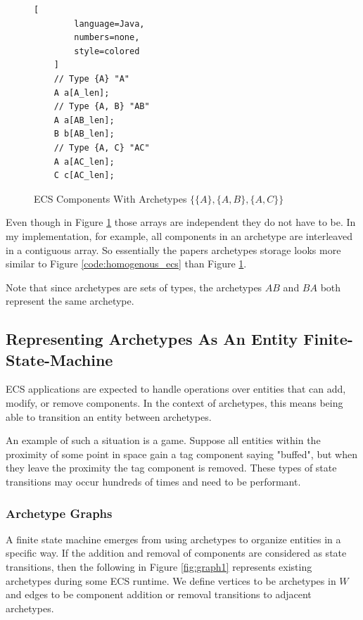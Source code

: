 \begin{figure}[H]
    \begin{lstlisting}[
        language=Java,
        numbers=none,
        style=colored
    ]
    // Type {A} "A"
    A a[A_len];
    // Type {A, B} "AB"
    A a[AB_len];
    B b[AB_len];
    // Type {A, C} "AC"
    A a[AC_len];
    C c[AC_len];
    \end{lstlisting}
    \caption{ECS Components With Archetypes $\{\{A\},\{A,B\},\{A,C\}\}$}
    \label{code:ecs_archetypes}
\end{figure}

Even though in Figure \ref{code:ecs_archetypes} those arrays are independent they do not have to be. In my implementation, for example, all components in an archetype are interleaved in a contiguous array. So essentially the papers archetypes storage looks more similar to Figure \ref{code:homogenous_ecs} than Figure \ref{code:ecs_archetypes}.

Note that since archetypes are sets of types, the archetypes $AB$ and $BA$ both represent the same archetype.

\subsection{Representing Archetypes As An Entity Finite-State-Machine}
\label{sec:fsm_arc}
ECS applications are expected to handle operations over entities that can add, modify, or remove components. In the context of archetypes, this means being able to transition an entity between archetypes. 

An example of such a situation is a game. Suppose all entities within the proximity of some point in space gain a tag component saying "buffed", but when they leave the proximity the tag component is removed. These types of state transitions may occur hundreds of times and need to be performant. 

\subsubsection{Archetype Graphs}

A finite state machine emerges from using archetypes to organize entities in a specific way. If the addition and removal of components are considered as state transitions, then the following in Figure \ref{fig:graph1} represents existing archetypes during some ECS runtime. We define vertices to be archetypes in $W$ and edges to be component addition or removal transitions to adjacent archetypes.

